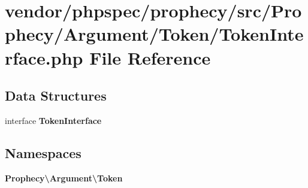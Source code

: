 \section{vendor/phpspec/prophecy/src/\+Prophecy/\+Argument/\+Token/\+Token\+Interface.php File Reference}
\label{phpspec_2prophecy_2src_2_prophecy_2_argument_2_token_2_token_interface_8php}
\subsection*{Data Structures}
\begin{DoxyCompactItemize}
\item 
interface {\bf Token\+Interface}
\end{DoxyCompactItemize}
\subsection*{Namespaces}
\begin{DoxyCompactItemize}
\item 
 {\bf Prophecy\textbackslash{}\+Argument\textbackslash{}\+Token}
\end{DoxyCompactItemize}
